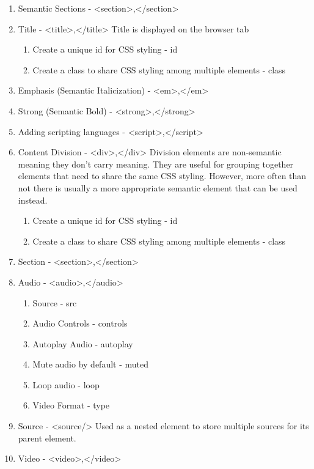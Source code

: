 \documentclass[11pt]{article}
\begin{document}
\begin{enumerate}
\begin{enumerate}
\item Create a unique id for CSS styling - id
\item Create a class to share CSS styling among multiple elements - class
\end{enumerate}
\item Semantic Sections - <section>,</section>
\item Title - <title>,</title>
Title is displayed on the browser tab
\begin{enumerate}
\item Create a unique id for CSS styling - id
\item Create a class to share CSS styling among multiple elements - class
\end{enumerate}
\item Emphasis (Semantic Italicization) - <em>,</em>
\item Strong (Semantic Bold) - <strong>,</strong>
\item Adding scripting languages - <script>,</script>
\item Content Division - <div>,</div>
Division elements are non-semantic meaning they don't carry meaning. They are useful for
grouping together elements that need to share the same CSS styling. However, more often than not
there is usually a more appropriate semantic element that can be used instead.
\begin{enumerate}
\item Create a unique id for CSS styling - id
\item Create a class to share CSS styling among multiple elements - class
\end{enumerate}
\item Section - <section>,</section>
\item Audio - <audio>,</audio>
\begin{enumerate}
\item Source - src
\item Audio Controls - controls
\item Autoplay Audio - autoplay
\item Mute audio by default - muted
\item Loop audio - loop
\item Video Format - type
\end{enumerate}
\item Source - <source/>
Used as a nested element to store multiple sources for its parent element.
\item Video - <video>,</video>       
\begin{enumerate}

\end{enumerate}
\end{enumerate}
\end{document}
